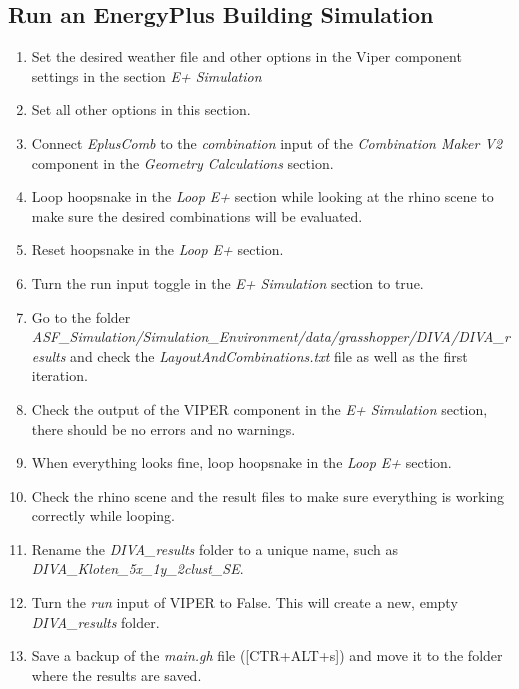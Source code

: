 	\subsection{Run an EnergyPlus Building Simulation}
	\begin{enumerate}

	\item Set the desired weather file and other options in the Viper component settings in the section \emph{E+ Simulation}

	\item Set all other options in this section. 

	\item Connect \emph{EplusComb} to the \emph{combination} input of the \emph{Combination Maker V2} component in the \emph{Geometry Calculations} section.  

	\item Loop hoopsnake in the \emph{Loop E+} section while looking at the rhino scene to make sure the desired combinations will be evaluated. 

	\item Reset hoopsnake in the \emph{Loop E+} section. 

	\item Turn the run input toggle in the \emph{E+ Simulation} section to true. 

	\item Go to the folder \emph{ASF\_Simulation/Simulation\_Environment/data/\linebreak grasshopper/DIVA/DIVA\_results} and check the \emph{LayoutAndCombinations.txt} file as well as the first iteration. 

	\item Check the output of the VIPER component in the \emph{E+ Simulation} section, there should be no errors and no warnings. 

	\item When everything looks fine, loop hoopsnake in the \emph{Loop E+} section. 

	\item Check the rhino scene and the result files to make sure everything is working correctly while looping. 

	\item Rename the \emph{DIVA\_results} folder to a unique name, such as \linebreak\emph{DIVA\_Kloten\_5x\_1y\_2clust\_SE}. 

	\item Turn the \emph{run} input of VIPER to False. This will create a new, empty \emph{DIVA\_results} folder. 
\
	\item Save a backup of the \emph{main.gh} file ([CTR+ALT+s]) and move it to the folder where the results are saved. 
	\end{enumerate}


